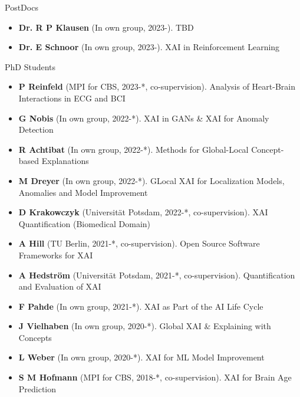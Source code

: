 
\newcommand{\supervision}[3]{\textbf{#1} (In own group, #2). {\small #3}}
\newcommand{\cosupervision}[4]{\textbf{#1} (#2, #3, co-supervision). {\small #4}}

\headedsection 
{PostDocs}
{
    \begin{itemize}
        \item [] \supervision{Dr. R P Klausen}{2023-}{TBD}
        \item [] \supervision{Dr. E Schnoor}{2023-}{XAI in Reinforcement Learning}
    \end{itemize}
}


\headedsection 
{PhD Students}
{
    \begin{itemize}
        \item [] \cosupervision{P Reinfeld}{MPI for CBS}{2023-*}{Analysis of Heart-Brain Interactions in ECG and BCI}

        \item [] \supervision{G Nobis}{2022-*}{XAI in GANs \& XAI for Anomaly Detection}
        \item [] \supervision{R Achtibat}{2022-*}{Methods for Global-Local Concept-based Explanations}
        \item [] \supervision{M Dreyer}{2022-*}{GLocal XAI for Localization Models, Anomalies and Model Improvement}
        
        \item [] \cosupervision{D Krakowczyk}{Universität Potsdam}{2022-*}{XAI Quantification (Biomedical Domain)}
        \item [] \cosupervision{A Hill}{TU Berlin}{2021-*}{Open Source Software Frameworks for XAI}
        \item [] \cosupervision{A Hedström}{Universität Potsdam}{2021-*}{Quantification and Evaluation of XAI}

        \item [] \supervision{F Pahde}{2021-*}{XAI as Part of the AI Life Cycle}
        \item [] \supervision{J Vielhaben}{2020-*}{Global XAI \& Explaining with Concepts}
        \item [] \supervision{L Weber}{2020-*}{XAI for ML Model Improvement}  
        
        \item [] \cosupervision{S M Hofmann}{MPI for CBS}{2018-*}{XAI for Brain Age Prediction}
        

\end{itemize}}
